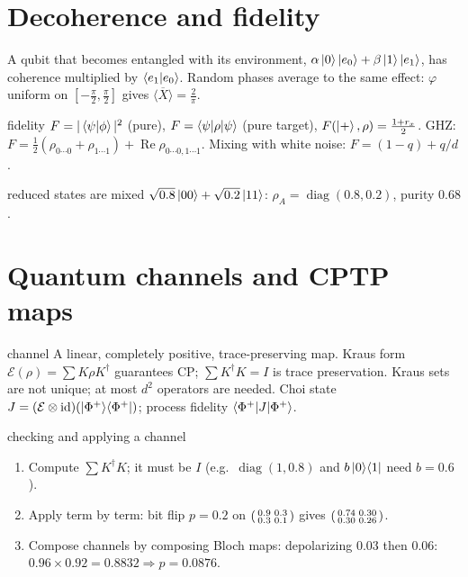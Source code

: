 \documentclass[11pt,a4paper,openany]{book}
\newcounter{wex}[chapter]
\newenvironment{steps}{\begin{enumerate}[label=\textbf{Step \arabic*.}, leftmargin=4.2em, itemsep=2pt]}{\end{enumerate}}
\newcommand{\E}{\mathcal E}
\begin{document}
\section{Decoherence and fidelity}
A qubit that becomes entangled with its environment, $\alpha\ket0\ket{e_0} + \beta\ket1\ket{e_1}$, has coherence multiplied by $\braket{e_1|e_0}$.
Random phases average to the same effect: $\varphi$ uniform on $[-\frac\pi2, \frac\pi2]$ gives $\overline{\langle X\rangle} = \frac2\pi$.
\begin{keyres}{fidelity}
$F = |\braket{\psi|\phi}|^2$ (pure), $F = \braket{\psi|\rho|\psi}$ (pure target), $F(\ket+, \rho) = \frac{1 + r_x}{2}$. GHZ:
$F = \frac12(\rho_{0\cdots0} + \rho_{1\cdots1}) + \operatorname{Re}\rho_{0\cdots0,1\cdots1}$. Mixing with white noise: $F = (1-q) + q/d$.
\end{keyres}
\begin{wexample}{reduced states are mixed}
$\sqrt{0.8}\ket{00} + \sqrt{0.2}\ket{11}$: $\rho_A = \operatorname{diag}(0.8, 0.2)$, purity $0.68$.
\end{wexample}

\section{Quantum channels and CPTP maps}
\begin{defn}{channel}
A linear, completely positive, trace-preserving map. Kraus form $\E(\rho) = \sum K\rho K^\dagger$ guarantees CP; $\sum K^\dagger K = I$ is trace preservation.
Kraus sets are not unique; at most $d^2$ operators are needed. Choi state $J = (\E\otimes\mathrm{id})(\ket{\Phi^+}\!\bra{\Phi^+})$; process fidelity $\braket{\Phi^+|J|\Phi^+}$.
\end{defn}
\begin{method}{checking and applying a channel}
\begin{steps}
\item Compute $\sum K^\dagger K$; it must be $I$ (e.g.\ $\operatorname{diag}(1, 0.8)$ and $b\ket0\!\bra1$ need $b = 0.6$).
\item Apply term by term: bit flip $p = 0.2$ on $\begin{psmallmatrix}0.9&0.3\\0.3&0.1\end{psmallmatrix}$ gives $\begin{psmallmatrix}0.74&0.30\\0.30&0.26\end{psmallmatrix}$.
\item Compose channels by composing Bloch maps: depolarizing $0.03$ then $0.06$: $0.96\times0.92 = 0.8832 \Rightarrow p = 0.0876$.
\end{steps}
\end{method}
\end{document}
